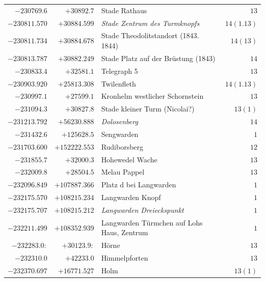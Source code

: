 \begin{center}
\begin{tabular}{r|r|p{170pt}|r}
\(-230769.6\)&\(+30892.7\)&Stade Rathaus&\(13\)\\
\(-230811.570\)&\(+30884.599\)&\textit{Stade Zentrum des Turmknopfs}&\(14(1.13)\)\\
\(-230811.734\)&\(+30884.678\)&Stade Theodolitstandort (1843. 1844)&\(14(13)\)\\
\(-230813.787\)&\(+30882.249\)&Stade Platz auf der Brüstung (1843)&\(14\)\\
\(-230833.4\)&\(+32581.1\)&Telegraph 5&\(13\)\\
\(-230903.920\)&\(+25813.308\)&Twilenfleth&\(14(1.13)\)\\
\(-230997.1\)&\(+27599.1\)&Kronhelm westlicher Schornstein&\(13\)\\
\(-231094.3\)&\(+30827.8\)&Stade kleiner Turm (Nicolai?)&\(13(1)\)\\
\(-231213.792\)&\(+56230.888\)&\textit{Dolosenberg}&\(14\)\\
\(-231432.6\)&\(+125628.5\)&Sengwarden&\(1\)\\
\(-231703.600\)&\(+152222.553\)&Rudiborsberg&\(12\)\\
\(-231855.7\)&\(+32000.3\)&Hohewedel Wache&\(13\)\\
\(-232009.8\)&\(+28504.5\)&Melau Pappel&\(13\)\\
\(-232096.849\)&\(+107887.366\)&Platz d bei Langwarden&\(1\)\\
\(-232175.570\)&\(+108215.234\)&Langwarden Knopf&\(1\)\\
\(-232175.707\)&\(+108215.212\)&\textit{Langwarden Dreieckspunkt}&\(1\)\\
\(-232211.499\)&\(+108352.939\)&Langwarden Türmchen auf Lohs Haus, Zentrum&\(1\)\\
\(-232283.0:\)&\(+30123.9:\)&Hörne&\(13\)\\
\(-232310.0\)&\(+42233.0\)&Himmelpforten&\(13\)\\
\(-232370.697\)&\(+16771.527\)&Holm&\(13(1)\)\\
\hline\end{tabular}\endgroup\end{center}
